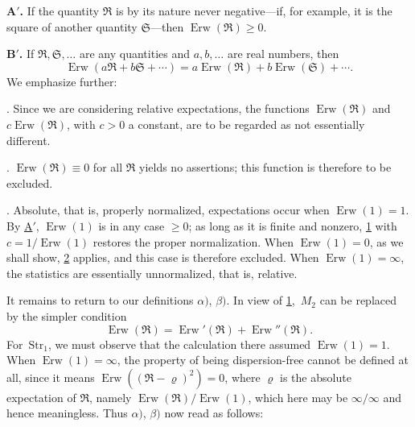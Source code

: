 \documentclass[fontsize=13pt,twoside,openany,headings=normal,parskip=false,bookmarkpackage=false,DIV=calc]{scrbook}
\begin{document}
\noindent{}\textbf{A$'$.}\label{cond:IV.Aprime} If the quantity $\mathfrak R$ is by its nature never negative---if, for example, it is the square of another quantity $\mathfrak S$---then $\operatorname{Erw}(\mathfrak R)\geq0$.

\noindent{}\textbf{B$'$.}\label{cond:IV.Bprime} If $\mathfrak R,\mathfrak S,\ldots$ are any quantities and $a,b,\ldots$ are real numbers, then
\[
\operatorname{Erw}(a\mathfrak R+b\mathfrak S+\cdots)=a\operatorname{Erw}(\mathfrak R)+b\operatorname{Erw}(\mathfrak S)+\cdots.
\]
We emphasize further:

\noindent{}.\label{remark:IV.1.1} Since we are considering relative expectations, the functions $\operatorname{Erw}(\mathfrak R)$ and $c\operatorname{Erw}(\mathfrak R)$, with $c>0$ a constant, are to be regarded as not essentially different.

\noindent{}.\label{remark:IV.1.2} $\operatorname{Erw}(\mathfrak R)\equiv0$ for all $\mathfrak R$ yields no assertions; this function is therefore to be excluded.

\noindent{}.\label{remark:IV.1.3} Absolute, that is, properly normalized, expectations occur when $\operatorname{Erw}(1)=1$. By \hyperref[cond:IV.Aprime]{A$'$}, $\operatorname{Erw}(1)$ is in any case $\geq0$; as long as it is finite and nonzero, \hyperref[remark:IV.1.1]{1} with $c=1/\operatorname{Erw}(1)$ restores the proper normalization. When $\operatorname{Erw}(1)=0$, as we shall show, \hyperref[remark:IV.1.2]{2} applies, and this case is therefore excluded. When $\operatorname{Erw}(1)=\infty$, the statistics are essentially unnormalized, that is, relative.

It remains to return to our definitions \hyperref[def:IV.1.alpha]{$\alpha)$}, \hyperref[def:IV.1.beta]{$\beta)$}. In view of \hyperref[remark:IV.1.1]{1},~\hyperref[eq:IV.1.M2]{$M_2$} can be replaced by the simpler condition
\begin{equation}\tag{$M_3$}\label{eq:IV.1.M3}
\operatorname{Erw}(\mathfrak R)=\operatorname{Erw}'(\mathfrak R)+\operatorname{Erw}''(\mathfrak R).
\end{equation}
For~\hyperref[eq:IV.1.Str1]{$\mathrm{Str}_1$}, we must observe that the calculation there assumed $\operatorname{Erw}(1)=1$. When $\operatorname{Erw}(1)=\infty$, the property of being dispersion-free cannot be defined at all, since it means $\operatorname{Erw}((\mathfrak R-\varrho)^2)=0$, where $\varrho$ is the absolute
\hypertarget{origpage-166}{}%
expectation of $\mathfrak R$, namely $\operatorname{Erw}(\mathfrak R)/\operatorname{Erw}(1)$, which here may be $\infty/\infty$ and hence meaningless. Thus \hyperref[def:IV.1.alpha]{$\alpha)$}, \hyperref[def:IV.1.beta]{$\beta)$} now read as follows:
\end{document}
